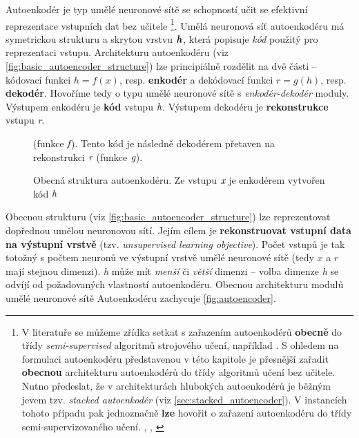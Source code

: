 Autoenkodér je typ umělé neuronové sítě se schopností učit se efektivní reprezentace vstupních dat bez učitele
\footnote{V literatuře se můžeme zřídka setkat s zařazením autoenkodérů \textbf{obecně} do třídy \emph{semi-supervised} algoritmů strojového učení, například \cite[str. 95]{Chollet2017}. S ohledem na formulaci autoenkodéru představenou v této kapitole je přesnější zařadit \textbf{obecnou} architekturu autoenkodérů do třídy algoritmů učení bez učitele. Nutno předeslat, že v architekturách hlubokých autoenkodérů je běžným jevem tzv. \emph{stacked autoenkodér} (viz \autoref{sec:stacked_autoencoder}). V instancích tohoto případu pak jednoznačně \textbf{lze} hovořit o zařazení autoenkodéru do třídy semi-supervizovaného učení. \cite{Bengio2006}, \cite{Ranzato2007}, \cite{Erhan2010}}.
Umělá neuronová síť autoenkodéru má symetrickou strukturu a skrytou vrstvu $\textbf{\emph{h}}$, která popisuje \emph{kód} použitý pro reprezentaci vstupu.
Architekturu autoenkodéru (viz \autoref{fig:basic_autoencoder_structure}) lze principiálně rozdělit na dvě části – kódovací funkci $h = f(x)$, resp. \textbf{enkodér}
a dekódovací funkci $r = g(h)$, resp. \textbf{dekodér}.
Hovoříme tedy o typu umělé neuronové sítě s \emph{enkodér-dekodér} moduly.
Výstupem enkodéru je \textbf{kód} vstupu $\emph{h}$. Výstupem dekodéru je \textbf{rekonstrukce} vstupu \emph{r}. \cite{Goodfellow2016}

\begin{figure}[h]
    \centering
    \caption{Obecná struktura autoenkodéru. Ze vstupu $\emph{x}$ je enkodérem vytvořen kód $\emph{h}$} (funkce $\emph{f}$). Tento kód je následně dekodérem přetaven na rekonstrukci $\emph{r}$ (funkce $\emph{g}$).
    \label{fig:basic_autoencoder_structure}
\end{figure}

Obecnou strukturu (viz \autoref{fig:basic_autoencoder_structure}) lze reprezentovat dopřednou umělou neuronovou sítí.
Jejím cílem je \textbf{rekonstruovat vstupní data na výstupní vrstvě} (tzv. \emph{unsupervised learning objective}). Počet vstupů je tak totožný s počtem neuronů ve výstupní vrstvě umělé neuronové sítě (tedy $x$ a $r$ mají stejnou dimenzi).
\emph{h} může mít \emph{menší} či \emph{větší} dimenzi – volba dimenze \emph{h} se odvíjí od požadovaných vlastností autoenkodéru.
Obecnou architekturu modulů umělé neuronové sítě Autoenkodéru zachycuje \autoref{fig:autoencoder}. \cite{Charte2018}



